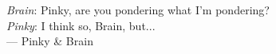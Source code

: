\thispagestyle{empty}
{}

\vspace*{3cm}

\begin{center}
\emph{Brain}: Pinky, are you pondering what I'm pondering? \\
\smallskip
\emph{Pinky}: I think so, Brain, but...
\\ \medskip
    --- Pinky \& Brain
\end{center}